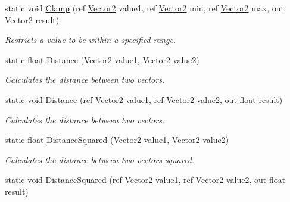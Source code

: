 \begin{DoxyCompactItemize}
static void \hyperlink{structMicrosoft_1_1Xna_1_1Framework_1_1Vector2_a7bb74b9be38246f9214c405184312ec1}{Clamp} (ref \hyperlink{structMicrosoft_1_1Xna_1_1Framework_1_1Vector2}{Vector2} value1, ref \hyperlink{structMicrosoft_1_1Xna_1_1Framework_1_1Vector2}{Vector2} min, ref \hyperlink{structMicrosoft_1_1Xna_1_1Framework_1_1Vector2}{Vector2} max, out \hyperlink{structMicrosoft_1_1Xna_1_1Framework_1_1Vector2}{Vector2} result)
\begin{DoxyCompactList}\small\item\em Restricts a value to be within a specified range.\end{DoxyCompactList}\item 
static float \hyperlink{structMicrosoft_1_1Xna_1_1Framework_1_1Vector2_a0db548b2ec68573550c7dde442ad4414}{Distance} (\hyperlink{structMicrosoft_1_1Xna_1_1Framework_1_1Vector2}{Vector2} value1, \hyperlink{structMicrosoft_1_1Xna_1_1Framework_1_1Vector2}{Vector2} value2)
\begin{DoxyCompactList}\small\item\em Calculates the distance between two vectors.\end{DoxyCompactList}\item 
static void \hyperlink{structMicrosoft_1_1Xna_1_1Framework_1_1Vector2_a533c440ed4a673b6256ea9252a19583c}{Distance} (ref \hyperlink{structMicrosoft_1_1Xna_1_1Framework_1_1Vector2}{Vector2} value1, ref \hyperlink{structMicrosoft_1_1Xna_1_1Framework_1_1Vector2}{Vector2} value2, out float result)
\begin{DoxyCompactList}\small\item\em Calculates the distance between two vectors.\end{DoxyCompactList}\item 
static float \hyperlink{structMicrosoft_1_1Xna_1_1Framework_1_1Vector2_aab7281830b46a753031d621728eec91c}{Distance\+Squared} (\hyperlink{structMicrosoft_1_1Xna_1_1Framework_1_1Vector2}{Vector2} value1, \hyperlink{structMicrosoft_1_1Xna_1_1Framework_1_1Vector2}{Vector2} value2)
\begin{DoxyCompactList}\small\item\em Calculates the distance between two vectors squared.\end{DoxyCompactList}\item 
static void \hyperlink{structMicrosoft_1_1Xna_1_1Framework_1_1Vector2_aac02879efa1340a643a568422484c617}{Distance\+Squared} (ref \hyperlink{structMicrosoft_1_1Xna_1_1Framework_1_1Vector2}{Vector2} value1, ref \hyperlink{structMicrosoft_1_1Xna_1_1Framework_1_1Vector2}{Vector2} value2, out float result)

\end{DoxyCompactItemize}
